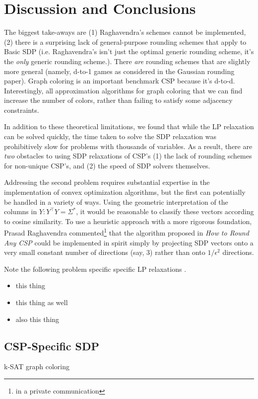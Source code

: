 \section{Discussion and Conclusions}	
	The biggest take-aways are (1) Raghavendra's schemes cannot be implemented, (2) there is a surprising lack of general-purpose rounding schemes that apply to Basic SDP (i.e. Raghavendra's isn't just the optimal generic rounding scheme, it's the \textit{only} generic rounding scheme.). There \textit{are} rounding schemes that are slightly more general (namely, d-to-1 games as considered in the Gaussian rounding paper). Graph coloring is an important benchmark CSP because it's d-to-d. Interestingly, all approximation algorithms for graph coloring that we can find increase the number of colors, rather than failing to satisfy some adjacency constraints. 
	
	In addition to these theoretical limitations, we found that while the LP relaxation can be solved quickly, the time taken to solve the SDP relaxation was prohibitively slow for problems with thousands of variables. As a result, there are \textit{two} obstacles to using SDP relaxations of CSP's (1) the lack of rounding schemes for non-unique CSP's, and (2) the speed of SDP solvers themselves.
	
	Addressing the second problem requires substantial expertise in the implementation of convex optimization algorithms, but the first can potentially be handled in a variety of ways. Using the geometric interpretation of the columns in $Y : Y^\intercal Y = \Sigma^*$, it would be reasonable to classify these vectors according to cosine similarity. To use a heuristic approach with a more rigorous foundation, Prasad Raghavendra commented\footnote{in a private communication} that the algorithm proposed in \textit{How to Round Any CSP} could be implemented in spirit simply by projecting SDP vectors onto a very small constant number of directions (say, 3) rather than onto $1/\epsilon^2$ directions.

Note the following problem specific specific LP relaxations \cite{GoeWil94,Asa97,Yan94}.
\begin{itemize}
\item this thing
\item this thing as well
\item also this thing
\end{itemize}

\subsection{CSP-Specific SDP}
k-SAT
graph coloring